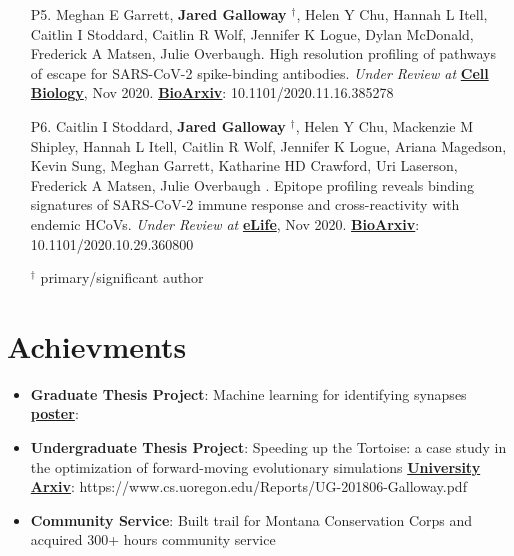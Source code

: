 \documentclass[letterpaper,11pt]{article}
\let\oldhref\href
\renewcommand{\href}[2]{\oldhref{#1}{\bfseries#2}}
\newcommand{\resumeItem}[2]{
  \item\small{
    \textbf{#1}{: #2 \vspace{-2pt}}
  }
}
\newcommand{\resumeSubItem}[2]{\resumeItem{#1}{#2}\vspace{-4pt}}
\newcommand{\resumeSubHeadingListStart}{\begin{itemize}[leftmargin=*]}
\newcommand{\resumeSubHeadingListEnd}{\end{itemize}}
\begin{document}
\begin{enumerate}

\item [P5.] Meghan E Garrett, \textbf{Jared Galloway} $^{\dagger}$, 
Helen Y Chu, Hannah L Itell, Caitlin I Stoddard, Caitlin R Wolf, Jennifer K Logue, Dylan McDonald, Frederick A Matsen, Julie Overbaugh.
High resolution profiling of pathways of escape for SARS-CoV-2 spike-binding antibodies.
\textit{Under Review at}
\href{https://www.nature.com/ncb/}{Cell Biology}, Nov 2020.
\href{https://www.biorxiv.org/content/10.1101/2020.11.16.385278v1.abstract}{BioArxiv}: 10.1101/2020.11.16.385278

\item [P6.] Caitlin I Stoddard, \textbf{Jared Galloway} $^{\dagger}$, 
Helen Y Chu, Mackenzie M Shipley, Hannah L Itell, 
Caitlin R Wolf, Jennifer K Logue, Ariana Magedson, Kevin Sung, Meghan Garrett, Katharine HD Crawford, Uri Laserson, Frederick A Matsen, Julie Overbaugh . 
Epitope profiling reveals binding signatures of SARS-CoV-2 immune response and cross-reactivity with endemic HCoVs.
\textit{Under Review at}
\href{https://elifesciences.org/?gclid=CjwKCAiA6vXwBRBKEiwAYE7iS0LA_KboY5NjoOVJAMq06BEUSsqPFV9R1GA1NUUIgYw2XgTiv1fUxhoC3xYQAvD_BwE}{eLife}, Nov 2020.
\href{biorxiv.org/content/10.1101/2020.10.29.360800v1.abstract}{BioArxiv}: 10.1101/2020.10.29.360800

\begin{center}
$^{\dagger}$ primary/significant author
\end{center}

\end{enumerate}


\section{Achievments}


\resumeSubHeadingListStart
    \resumeSubItem{Graduate Thesis Project}
    {
        Machine learning for identifying synapses
    }\href{}{poster}:  
    \resumeSubItem{Undergraduate Thesis Project}
    {
        Speeding up the Tortoise: a case study in the optimization of forward-moving evolutionary simulations
    }\href{https://www.cs.uoregon.edu/Reports/UG-201806-Galloway.pdf}{University Arxiv}: https://www.cs.uoregon.edu/Reports/UG-201806-Galloway.pdf
    \resumeSubItem{Community Service}
    {
        Built trail for Montana Conservation Corps and acquired 300+
        hours community service
    }
\resumeSubHeadingListEnd
\end{document}
